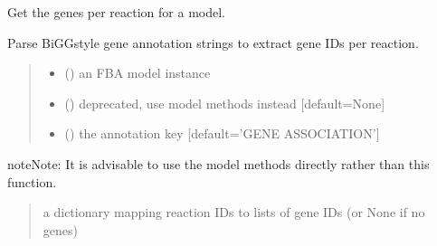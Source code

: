 \documentclass[letterpaper,12pt,english]{sphinxmanual}
\begin{document}

\begin{fulllineitems}
\label{\detokenize{api/core:cbmpy.CBTools.getModelGenesPerReaction}}
\pysigstartsignatures
\pysiglinewithargsret
{}
{\sphinxparamcomma {}\sphinxparamcomma {}}
{}
\pysigstopsignatures
\sphinxAtStartPar
Get the genes per reaction for a model.

\sphinxAtStartPar
Parse BiGG\sphinxhyphen{}style gene annotation strings to extract gene IDs per reaction.
\begin{quote}\begin{description}
\begin{itemize}
\item {} 
\sphinxAtStartPar
{} () \textendash{} an FBA model instance

\item {} 
\sphinxAtStartPar
{} (\sphinxstyleliteralemphasis{\sphinxupquote{, }}) \textendash{} deprecated, use model methods instead {[}default=None{]}

\item {} 
\sphinxAtStartPar
{} (\sphinxstyleliteralemphasis{\sphinxupquote{, }}) \textendash{} the annotation key {[}default=’GENE ASSOCIATION’{]}

\end{itemize}

\end{description}\end{quote}

\begin{sphinxadmonition}{note}{Note:}
\sphinxAtStartPar
It is advisable to use the model methods directly rather than this function.
\end{sphinxadmonition}
\begin{quote}\begin{description}
\sphinxAtStartPar
{} \textendash{} a dictionary mapping reaction IDs to lists of gene IDs (or None if no genes)

\end{description}\end{quote}

\end{fulllineitems}
\end{document}
